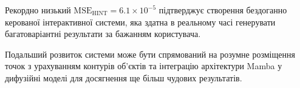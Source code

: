     Рекордно низький $\mathrm{MSE}_{\mathrm{HINT}} = 6.1 \times 10^{-5}$ підтверджує створення бездоганно керованої інтерактивної системи,
    яка здатна в реальному часі генерувати багатоваріантні результати за бажанням користувача.

    Подальший розвиток системи може бути спрямований на розумне розміщення точок з урахуванням контурів об'єктів
    та інтеграцію архітектури Mamba у дифузійні моделі для досягнення ще більш чудових результатів.



        



